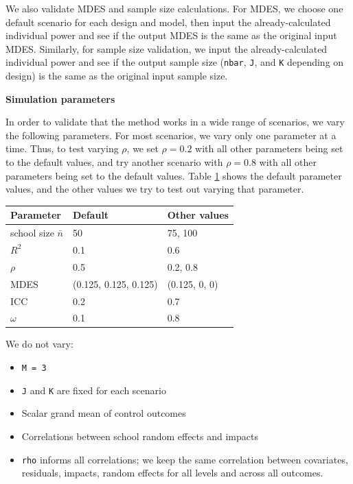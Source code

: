 \documentclass[
]{article}
\providecommand{\tightlist}{%
  \setlength{\itemsep}{0pt}\setlength{\parskip}{0pt}}
\begin{document}
We also validate MDES and sample size calculations. For MDES, we choose
one default scenario for each design and model, then input the
already-calculated individual power and see if the output MDES is the
same as the original input MDES. Similarly, for sample size validation,
we input the already-calculated individual power and see if the output
sample size (\texttt{nbar}, \texttt{J}, and \texttt{K} depending on
design) is the same as the original input sample size.

\textbf{Simulation parameters}

In order to validate that the method works in a wide range of scenarios,
we vary the following parameters. For most scenarios, we vary only one
parameter at a time. Thus, to test varying \(\rho\), we set
\(\rho = 0.2\) with all other parameters being set to the default
values, and try another scenario with \(\rho = 0.8\) with all other
parameters being set to the default values. Table \ref{tab:val_params}
shows the default parameter values, and the other values we try to test
out varying that parameter.

\begin{table}
\centering
\begin{tabular}{l l l}
\toprule
Parameter               & Default                & Other values \\ \midrule
school size $\bar{n}$   & 50                     & 75, 100           \\
$R^2$                   & 0.1                    & 0.6               \\
$\rho$                  & 0.5                    & 0.2, 0.8          \\
MDES                    & (0.125, 0.125, 0.125)  & (0.125, 0, 0)     \\
ICC                     & 0.2                    & 0.7               \\
$\omega$                & 0.1                    & 0.8               \\
\bottomrule
\end{tabular}
\label{tab:val_params}
\end{table}

We do not vary:

\begin{itemize}
\tightlist
\item
  \texttt{M\ =\ 3}
\item
  \texttt{J} and \texttt{K} are fixed for each scenario
\item
  Scalar grand mean of control outcomes
\item
  Correlations between school random effects and impacts
\item
  \texttt{rho} informs all correlations; we keep the same correlation
  between covariates, residuals, impacts, random effects for all levels
  and across all outcomes.
\end{itemize}
\end{document}
